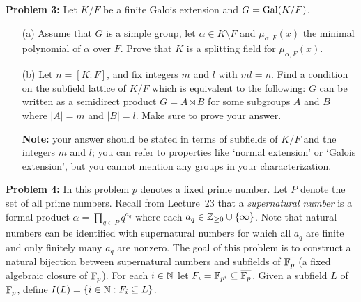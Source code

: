 \documentclass[12pt]{amsart}
\begin{document}
\newpage
{\bf Problem 3: } Let $K/F$ be a finite Galois extension and $G={\rm Gal}(K/F)$.
\begin{itemize}
\item[(a)] Assume  that $G$ is a simple group, let $\alpha\in K\setminus F$
and $\mu_{\alpha,F}(x)$ the minimal polynomial of $\alpha$ over $F$.
Prove that $K$ is a splitting field for $\mu_{\alpha,F}(x)$.

\item[(b)] Let $n=[K:F]$, and fix integers $m$ and $l$ with $ml=n$.
Find a condition on the \underline{subfield lattice of $K/F$} which is equivalent
to the following: $G$ can be written as a semidirect product $G=A\rtimes B$
for some subgroups $A$ and $B$ where $|A|=m$ and $|B|=l$. Make sure to prove your answer.


\skv
\noindent
{\bf Note:} your answer should be stated in terms of subfields of $K/F$ and the integers $m$ and $l$; you can refer to properties like `normal extension' or `Galois extension', but you cannot mention any groups in your characterization.
\end{itemize}
\skv
{\bf Problem 4: }In this problem $p$ denotes a fixed prime number. Let $P$ denote the set of all prime numbers. Recall from Lecture~23 that
a {\it supernatural number} is a formal product $\alpha=\prod\limits_{q\in P}q^{a_q}$ where each $a_q\in{\mathbb Z}_{\geq 0}\cup\{\infty\}$.
Note that natural numbers can be identified with supernatural numbers for which all $a_q$ are finite and only finitely many $a_q$ are nonzero.
The goal of this problem is to construct a natural bijection between supernatural numbers and subfields of $\overline {{\mathbb F}_p}$
(a fixed algebraic closure of ${\mathbb F}_{p}$).
\skv
For each $i\in{\mathbb N}$ let $F_i={\mathbb F}_{p^i}\subseteq \overline{{\mathbb F}_p}$. Given a subfield $L$ of $ \overline{{\mathbb F}_p}$, define
$I(L)=\{i\in{\mathbb N}: F_i\subseteq L\}$.
\end{document}
